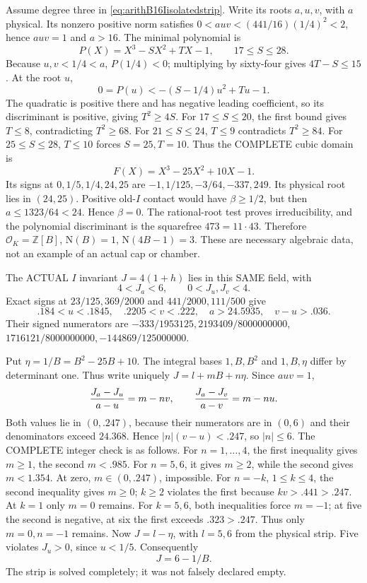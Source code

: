 \documentclass[11pt]{article}
\begin{document}
Assume degree three in
\eqref{eq:arithB16Iisolatedstrip}.
Write its roots \(a,u,v\), with \(a\)
physical.
Its nonzero positive norm satisfies
\(0<auv<(441/16)(1/4)^2<2\), hence
\(auv=1\) and \(a>16\).
The minimal polynomial is
\[
                    P(X)=X^3-SX^2+TX-1,\qquad17\le S\le28 .
\]
Because \(u,v<1/4<a\), \(P(1/4)<0\);
multiplying by sixty-four gives
\(4T-S\le15\).
At the root \(u\),
\[
                  0=P(u)<-(S-1/4)u^2+Tu-1 .
\]
The quadratic is positive there and has
negative leading coefficient, so its
discriminant is positive, giving \(T^2\ge4S\).
For \(17\le S\le20\), the first bound
gives \(T\le8\), contradicting \(T^2\ge68\).
For \(21\le S\le24\), \(T\le9\)
contradicts \(T^2\ge84\).
For \(25\le S\le28\), \(T\le10\)
forces \(S=25,T=10\).
Thus the COMPLETE cubic domain is
\[
                         F(X)=X^3-25X^2+10X-1 .
\]
Its signs at \(0,1/5,1/4,24,25\) are
\(-1,1/125,-3/64,-337,249\).
Its physical root lies in \((24,25)\).
Positive old-\(I\) contact would have
\(\beta\ge1/2\), but then
\(a\le1323/64<24\).
Hence \(\beta=0\).
The rational-root test proves irreducibility,
and the polynomial discriminant is the
squarefree \(473=11\cdot43\).
Therefore \(\mathcal O_K=\mathbb Z[B]\),
\(\mathrm N(B)=1\), \(\mathrm N(4B-1)=3\).
These are necessary algebraic data, not
an example of an actual cap or chamber.

The ACTUAL \(I\) invariant \(J=4(1+h)\)
lies in this SAME field, with
\[
                           4<J_a<6,\qquad0<J_u,J_v<4 .
\]
Exact signs at \(23/125,369/2000\)
and \(441/2000,111/500\) give
\[
             .184<u<.1845,\quad .2205<v<.222,\quad
             a>24.5935,\quad v-u>.036 .
\]
Their signed numerators are
\(-333/1953125,2193409/8000000000\),
\(1716121/8000000000,-144869/125000000\).

Put \(\eta=1/B=B^2-25B+10\).
The integral bases \(1,B,B^2\) and
\(1,B,\eta\) differ by determinant one.
Thus write uniquely \(J=l+mB+n\eta\).
Since \(auv=1\),
\[
             {J_a-J_u\over a-u}=m-nv,\qquad
             {J_a-J_v\over a-v}=m-nu .
\]
Both values lie in \((0,.247)\), because
their numerators are in \((0,6)\) and
their denominators exceed \(24.368\).
Hence \(|n|(v-u)<.247\), so \(|n|\le6\).
The COMPLETE integer check is as follows.
For \(n=1,\ldots,4\), the first inequality
gives \(m\ge1\), the second \(m<.985\).
For \(n=5,6\), it gives \(m\ge2\),
while the second gives \(m<1.354\).
At zero, \(m\in(0,.247)\), impossible.
For \(n=-k\), \(1\le k\le4\),
the second inequality gives \(m\ge0\);
\(k\ge2\) violates the first because
\(kv>.441>.247\).
At \(k=1\) only \(m=0\) remains.
For \(k=5,6\), both inequalities force
\(m=-1\); at five the second is negative,
at six the first exceeds \(.323>.247\).
Thus only \(m=0,n=-1\) remains.
Now \(J=l-\eta\), with \(l=5,6\)
from the physical strip.
Five violates \(J_u>0\), since \(u<1/5\).
Consequently
\[
                                  J=6-1/B .
\]
The strip is solved completely; it was
not falsely declared empty.
\end{document}
